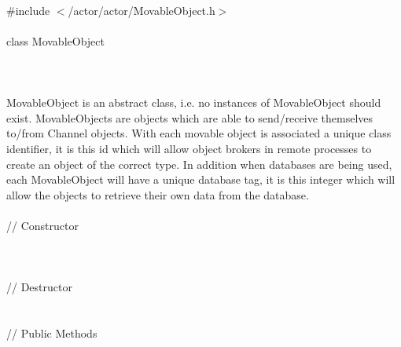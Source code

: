 
   \\
\indent \#include $<$/actor/actor/MovableObject.h$>$  \\

  \\
\indent class MovableObject \\

 \\
 \\

  \\
\indent MovableObject is an abstract class, i.e. no instances of MovableObject
should exist. MovableObjects are objects which are able to
send/receive themselves to/from Channel objects. With each movable
object is associated a unique class identifier, it is this id which
will allow object brokers in remote processes to create an object of
the correct type. In addition when databases are being used, each
MovableObject will have a unique database tag, it is this integer
which will allow the objects to retrieve their own data from the database. \\ 


  \\
\indent\indent // Constructor  \\
\indent{}  \\
\indent{}  \\ \\
\indent\indent // Destructor \\
\indent{}\\  \\
\indent\indent // Public Methods  \\
\indent{}\\
\indent{}\\
\indent{}\\
\indent{} \\ 
\indent{} \\ 


